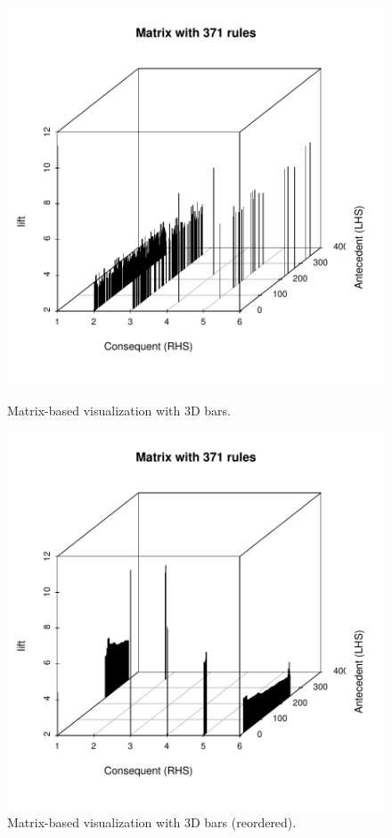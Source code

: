 \documentclass[nojss]{jss}
\begin{document}
\begin{figure}
\begin{minipage}{.48\linewidth}
\centering
\includegraphics[width=\linewidth]{arulesViz-matrix3D1}
\caption{Matrix-based visualization with 3D bars.
\label{fig:matrix3D1}}
\end{minipage}
\begin{minipage}{.48\linewidth}
\includegraphics[width=\linewidth]{arulesViz-matrix3D2}
\caption{Matrix-based visualization with 3D bars (reordered).
\label{fig:matrix3D2}}
\end{minipage}
\end{figure}
\end{document}
